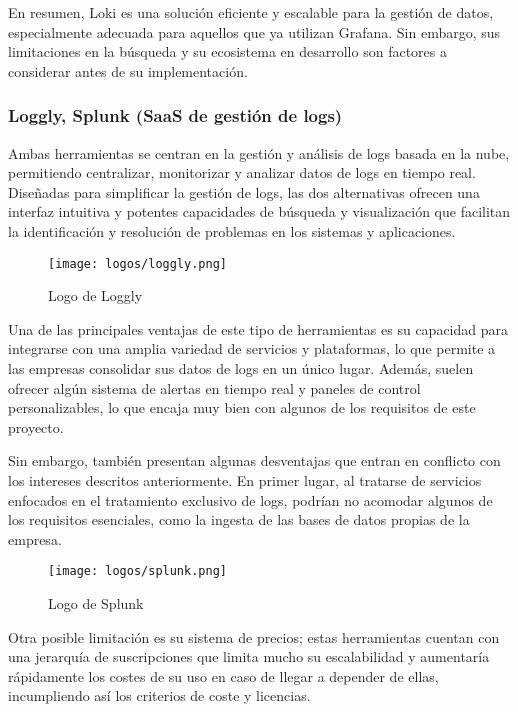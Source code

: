 En resumen, Loki es una solución eficiente y escalable para la gestión de datos,
especialmente adecuada para aquellos que ya utilizan Grafana. Sin embargo, sus
limitaciones en la búsqueda y su ecosistema en desarrollo son factores a
considerar antes de su implementación.


\newpage
\subsubsection{Loggly, Splunk (SaaS de gestión de logs)}
Ambas herramientas se centran en la gestión y análisis de logs basada en la nube,
permitiendo centralizar, monitorizar y analizar datos de logs en tiempo real.
Diseñadas para simplificar la gestión de logs, las dos alternativas ofrecen una
interfaz intuitiva y potentes capacidades de búsqueda y visualización que
facilitan la identificación y resolución de problemas en los sistemas y
aplicaciones.

\begin{figure}[H]
	\centering
	\texttt{[image: logos/loggly.png]}
	\caption{Logo de Loggly~\textregistered}
\end{figure}

Una de las principales ventajas de este tipo de herramientas es su capacidad
para integrarse con una amplia variedad de servicios y plataformas, lo que
permite a las empresas consolidar sus datos de logs en un único lugar. Además,
suelen ofrecer algún sistema de alertas en tiempo real y paneles de control
personalizables, lo que encaja muy bien con algunos de los requisitos de este
proyecto.

Sin embargo, también presentan algunas desventajas que entran en conflicto con
los intereses descritos anteriormente. En primer lugar, al tratarse de
servicios enfocados en el tratamiento exclusivo de logs, podrían no acomodar
algunos de los requisitos esenciales, como la ingesta de las bases de datos
propias de la empresa.

\begin{figure}[H]
	\centering
	\texttt{[image: logos/splunk.png]}
	\caption{Logo de Splunk~\textregistered}
\end{figure}

Otra posible limitación es su sistema de precios; estas herramientas cuentan con
una jerarquía de suscripciones que limita mucho su escalabilidad y aumentaría
rápidamente los costes de su uso en caso de llegar a depender de ellas,
incumpliendo así los criterios de coste y licencias.

